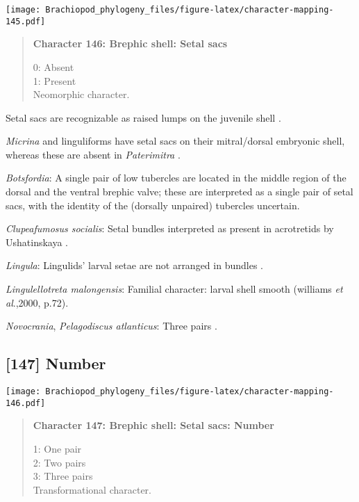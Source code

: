 \documentclass[openany]{book}
\theoremstyle{definition}
\theoremstyle{definition}
\theoremstyle{definition}
\theoremstyle{remark}
\begin{document}
\texttt{[image: Brachiopod\_phylogeny\_files/figure-latex/character-mapping-145.pdf]}

\begin{quote}
\textbf{Character 146: Brephic shell: Setal sacs}

0: Absent\\
1: Present\\
Neomorphic character.
\end{quote}

Setal sacs are recognizable as raised lumps on the juvenile shell
\citep[see][]{Bassett2017Earliestontogeny}.

\emph{Micrina} and linguliforms have setal sacs on their mitral/dorsal
embryonic shell, whereas these are absent in \emph{Paterimitra}
\citep{Holmer2011Firstrecord}.

\hypertarget{Botsfordia-coding-146}{}
\emph{Botsfordia}: A single pair of low tubercles are \citep[ state
``may be'']{Ushatinskaya2016Revisionof} located in the middle region of
the dorsal and the ventral brephic valve; these are interpreted as a
single pair of setal sacs, with the identity of the (dorsally unpaired)
tubercles uncertain.

\hypertarget{Clupeafumosus_socialis-coding-146}{}
\emph{Clupeafumosus socialis}: Setal bundles interpreted as present in
acrotretids by Ushatinskaya \citeyearpar{Ushatinskaya2016Protegulumand}.

\hypertarget{Lingula-coding-146}{}
\emph{Lingula}: Lingulids' larval setae are not arranged in bundles
\citep{Carlson1995Phylogeneticrelationships}.

\hypertarget{Lingulellotreta_malongensis-coding-146}{}
\emph{Lingulellotreta malongensis}: Familial character: larval shell
smooth (williams \emph{et al}.,2000, p.72).

\hypertarget{Novocrania-coding-146}{}
\emph{Novocrania}, \emph{Pelagodiscus atlanticus}: Three pairs
\citep{Carlson1995Phylogeneticrelationships}.

\subsection*{{[}147{]} Number}\label{number}

\texttt{[image: Brachiopod\_phylogeny\_files/figure-latex/character-mapping-146.pdf]}

\begin{quote}
\textbf{Character 147: Brephic shell: Setal sacs: Number}

1: One pair\\
2: Two pairs\\
3: Three pairs\\
Transformational character.
\end{quote}
\end{document}
